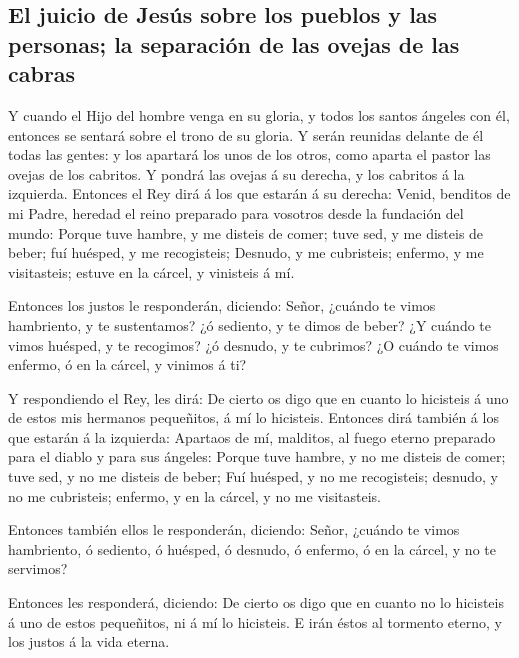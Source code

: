 \hypertarget{el-juicio-de-jesuxfas-sobre-los-pueblos-y-las-personas-la-separaciuxf3n-de-las-ovejas-de-las-cabras}{%
\subsection{El juicio de Jesús sobre los pueblos y las personas; la
separación de las ovejas de las
cabras}\label{el-juicio-de-jesuxfas-sobre-los-pueblos-y-las-personas-la-separaciuxf3n-de-las-ovejas-de-las-cabras}}

 Y cuando el Hijo del hombre venga en su gloria, y todos
los santos ángeles con él, entonces se sentará sobre el trono de su
gloria.  Y serán reunidas delante de él todas las gentes:
y los apartará los unos de los otros, como aparta el pastor las ovejas
de los cabritos.  Y pondrá las ovejas á su derecha, y los
cabritos á la izquierda.  Entonces el Rey dirá á los que
estarán á su derecha: Venid, benditos de mi Padre, heredad el reino
preparado para vosotros desde la fundación del mundo: 
Porque tuve hambre, y me disteis de comer; tuve sed, y me disteis de
beber; fuí huésped, y me recogisteis;  Desnudo, y me
cubristeis; enfermo, y me visitasteis; estuve en la cárcel, y vinisteis
á mí.

 Entonces los justos le responderán, diciendo: Señor,
¿cuándo te vimos hambriento, y te sustentamos? ¿ó sediento, y te dimos
de beber?  ¿Y cuándo te vimos huésped, y te recogimos? ¿ó
desnudo, y te cubrimos?  ¿O cuándo te vimos enfermo, ó en
la cárcel, y vinimos á ti?

 Y respondiendo el Rey, les dirá: De cierto os digo que
en cuanto lo hicisteis á uno de estos mis hermanos pequeñitos, á mí lo
hicisteis.  Entonces dirá también á los que estarán á la
izquierda: Apartaos de mí, malditos, al fuego eterno preparado para el
diablo y para sus ángeles:  Porque tuve hambre, y no me
disteis de comer; tuve sed, y no me disteis de beber; 
Fuí huésped, y no me recogisteis; desnudo, y no me cubristeis; enfermo,
y en la cárcel, y no me visitasteis.

 Entonces también ellos le responderán, diciendo: Señor,
¿cuándo te vimos hambriento, ó sediento, ó huésped, ó desnudo, ó
enfermo, ó en la cárcel, y no te servimos?

 Entonces les responderá, diciendo: De cierto os digo que
en cuanto no lo hicisteis á uno de estos pequeñitos, ni á mí lo
hicisteis.  E irán éstos al tormento eterno, y los justos
á la vida eterna.

